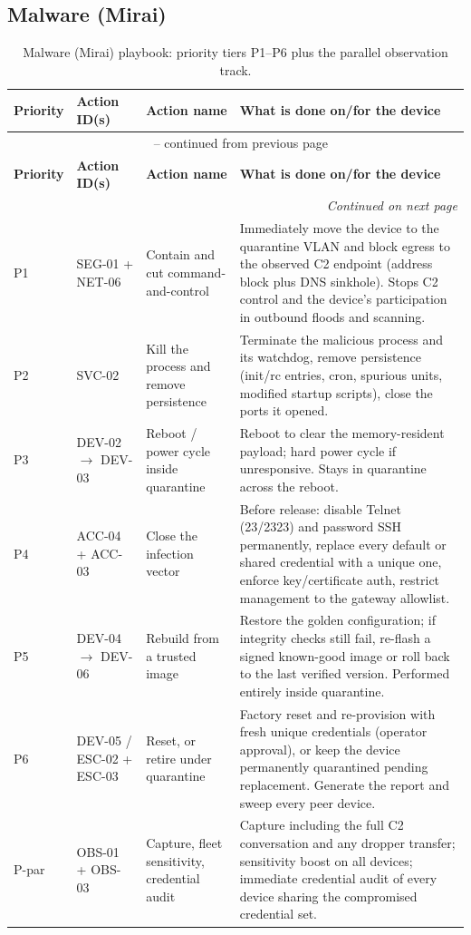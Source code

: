 \subsection{Malware (Mirai)}

\begin{longtable}{|p{}|p{}|p{}|p{}|}
\caption{Malware (Mirai) playbook: priority tiers P1--P6 plus the parallel observation track.}
\label{tab:playbook_mirai}\\
\hline
\textbf{Priority} & \textbf{Action ID(s)} & \textbf{Action name} & \textbf{What is done on/for the device} \\
\hline
\endfirsthead
\multicolumn{4}{c}{\tablename\ \thetable{} -- continued from previous page}\\
\hline
\textbf{Priority} & \textbf{Action ID(s)} & \textbf{Action name} & \textbf{What is done on/for the device} \\
\hline
\endhead
\hline \multicolumn{4}{r}{\textit{Continued on next page}}\\
\endfoot
\hline
\endlastfoot
P1 & SEG-01 + NET-06 & Contain and cut command-and-control & Immediately move the device to the quarantine VLAN and block egress to the observed C2 endpoint (address block plus DNS sinkhole). Stops C2 control and the device's participation in outbound floods and scanning. \\
\hline
P2 & SVC-02 & Kill the process and remove persistence & Terminate the malicious process and its watchdog, remove persistence (init/rc entries, cron, spurious units, modified startup scripts), close the ports it opened. \\
\hline
P3 & DEV-02 $\rightarrow$ DEV-03 & Reboot / power cycle inside quarantine & Reboot to clear the memory-resident payload; hard power cycle if unresponsive. Stays in quarantine across the reboot. \\
\hline
P4 & ACC-04 + ACC-03 & Close the infection vector & Before release: disable Telnet (23/2323) and password SSH permanently, replace every default or shared credential with a unique one, enforce key/certificate auth, restrict management to the gateway allowlist. \\
\hline
P5 & DEV-04 $\rightarrow$ DEV-06 & Rebuild from a trusted image & Restore the golden configuration; if integrity checks still fail, re-flash a signed known-good image or roll back to the last verified version. Performed entirely inside quarantine. \\
\hline
P6 & DEV-05 / ESC-02 + ESC-03 & Reset, or retire under quarantine & Factory reset and re-provision with fresh unique credentials (operator approval), or keep the device permanently quarantined pending replacement. Generate the report and sweep every peer device. \\
\hline
P-par & OBS-01 + OBS-03 & Capture, fleet sensitivity, credential audit & Capture including the full C2 conversation and any dropper transfer; sensitivity boost on all devices; immediate credential audit of every device sharing the compromised credential set. \\
\hline
\end{longtable}